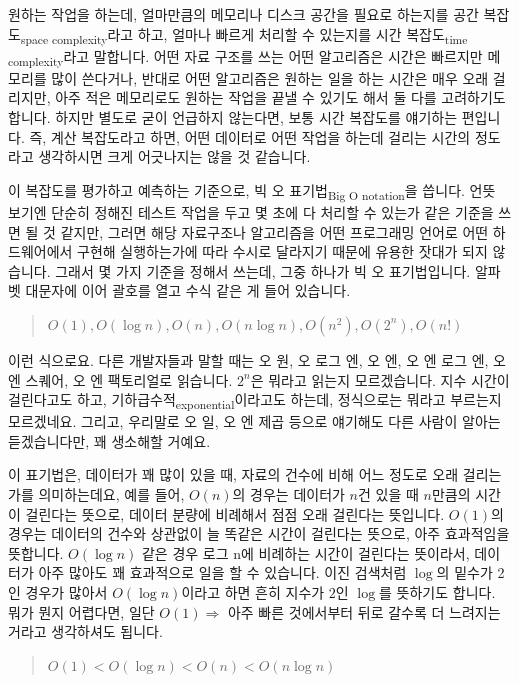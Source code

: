 \documentclass[11pt,a4paper]{article}
\newcommand{\sub}[1]{\textsubscript{#1}}
\begin{document}
원하는 작업을 하는데, 얼마만큼의 메모리나 디스크 공간을 필요로 하는지를 \textsf{공간 복잡도\sub{space complexity}}라고 하고, 얼마나 빠르게 처리할 수 있는지를 \textsf{시간 복잡도\sub{time complexity}}라고 말합니다. 어떤 자료 구조를 쓰는 어떤 알고리즘은 시간은 빠르지만 메모리를 많이 쓴다거나, 반대로 어떤 알고리즘은 원하는 일을 하는 시간은 매우 오래 걸리지만, 아주 적은 메모리로도 원하는 작업을 끝낼 수 있기도 해서 둘 다를 고려하기도 합니다. 하지만 별도로 굳이 언급하지 않는다면, 보통 \textsf{시간 복잡도}를 얘기하는 편입니다. 즉, \textsf{계산 복잡도}라고 하면, 어떤 데이터로 어떤 작업을 하는데 걸리는 시간의 정도라고 생각하시면 크게 어긋나지는 않을 것 같습니다.

이 복잡도를 평가하고 예측하는 기준으로, \textsf{빅 오 표기법\sub{Big O notation}}을 씁니다. 언뜻 보기엔 단순히 정해진 테스트 작업을 두고 몇 초에 다 처리할 수 있는가 같은 기준을 쓰면 될 것 같지만, 그러면 해당 자료구조나 알고리즘을 어떤 프로그래밍 언어로 어떤 하드웨어에서 구현해 실행하는가에 따라 수시로 달라지기 때문에 유용한 잣대가 되지 않습니다. 그래서 몇 가지 기준을 정해서 쓰는데, 그중 하나가 빅 오 표기법입니다. 알파벳 대문자에 이어 괄호를 열고 수식 같은 게 들어 있습니다.

\begin{quote}
$ O(1), O(\log n), O(n), O(n \log n), O(n^2), O(2^n), O(n!) $
\end{quote}

이런 식으로요. 다른 개발자들과 말할 때는 오 원, 오 로그 엔, 오 엔, 오  엔 로그 엔, 오 엔 스퀘어, 오 엔 팩토리얼로 읽습니다. $2^n$은 뭐라고 읽는지 모르겠습니다. 지수 시간이 걸린다고도 하고, 기하급수적\sub{exponential}이라고도 하는데, 정식으로는 뭐라고 부르는지 모르겠네요. 그리고, 우리말로 오 일, 오 엔 제곱 등으로 얘기해도 다른 사람이 알아는 듣겠습니다만, 꽤 생소해할 거예요.

이 표기법은, 데이터가 꽤 많이 있을 때, 자료의 건수에 비해 어느 정도로 오래 걸리는가를 의미하는데요, 예를 들어, $O(n)$의 경우는 데이터가 $n$건 있을 때 $n$만큼의 시간이 걸린다는 뜻으로, 데이터 분량에 비례해서 점점 오래 걸린다는 뜻입니다. $O(1)$의 경우는 데이터의 건수와 상관없이 늘 똑같은 시간이 걸린다는 뜻으로, 아주 효과적임을 뜻합니다. $O(\log n)$ 같은 경우 로그 n에 비례하는 시간이 걸린다는 뜻이라서, 데이터가 아주 많아도 꽤 효과적으로 일을 할 수 있습니다. 이진 검색처럼 $\log$의 밑수가 2인 경우가 많아서 $O(\log n)$이라고 하면 흔히 지수가 $2$인 $\log$를 뜻하기도 합니다. 뭐가 뭔지 어렵다면, 일단 $O(1) \Rightarrow $ \textsf{아주 빠른 것}에서부터 뒤로 갈수록 더 느려지는 거라고 생각하셔도 됩니다.

\begin{quote}
$  O(1) < O(\log n) < O(n) < O(n \log n) $
\end{quote}
\end{document}

